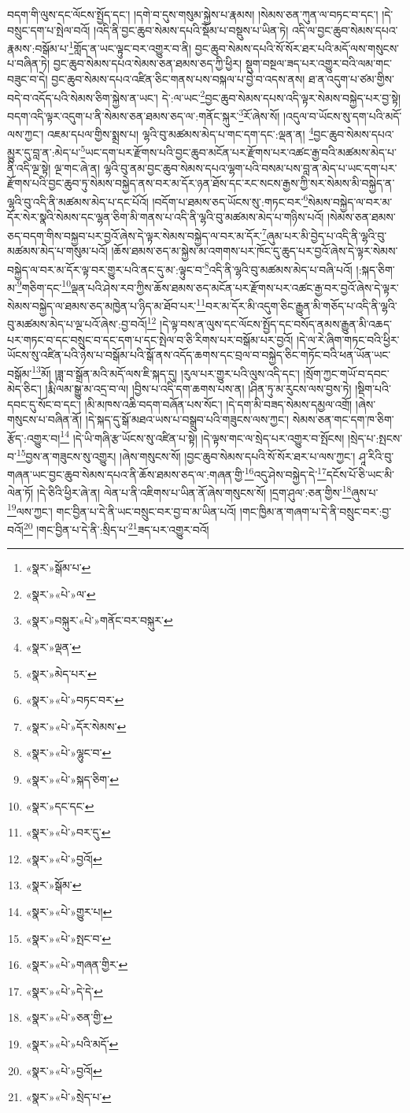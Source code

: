 བདག་གི་ལུས་དང་ལོངས་སྤྱོད་དང་། །དགེ་བ་དུས་གསུམ་སྐྱེས་པ་རྣམས། །སེམས་ཅན་ཀུན་ལ་བཏང་བ་དང་། །དེ་བསྲུང་དག་པ་སྤེལ་བའོ། །འདི་ནི་བྱང་ཆུབ་སེམས་དཔའི་སྡོམ་པ་བསྡུས་པ་ཡིན་ཏེ། འདི་ལ་བྱང་ཆུབ་སེམས་དཔའ་རྣམས་:བསྒོམ་པ་\footnote{«སྣར་»སྒོམ་པ་}གློད་ན་ཡང་ལྟུང་བར་འགྱུར་བ་ནི། བྱང་ཆུབ་སེམས་དཔའི་སོ་སོར་ཐར་པའི་མདོ་ལས་གསུངས་པ་བཞིན་ཏེ། བྱང་ཆུབ་སེམས་དཔའ་སེམས་ཅན་ཐམས་ཅད་ཀྱི་ཕྱིར། སྡུག་བསྔལ་ཟད་པར་འགྱུར་བའི་ལམ་གང་བཟུང་བ་དེ། བྱང་ཆུབ་སེམས་དཔའ་འཛིན་ཅིང་གནས་པས་བསྐལ་པ་བྱེ་བ་འདས་ནས། ཐ་ན་འདུག་པ་ཙམ་གྱིས་བདེ་བ་འདོད་པའི་སེམས་ཅིག་སྐྱེས་ན་ཡང་། དེ་:ལ་ཡང་\footnote{«སྣར་»«པེ་»ལ་}བྱང་ཆུབ་སེམས་དཔས་འདི་ལྟར་སེམས་བསྐྱེད་པར་བྱ་སྟེ། བདག་འདི་ལྟར་འདུག་པ་ནི་སེམས་ཅན་ཐམས་ཅད་ལ་:གནོང་སྐུར་\footnote{«སྣར་»བསྐུར་«པེ་»གནོང་བར་བསྐུར་}རོ་ཞེས་སོ། །འདུལ་བ་ཡོངས་སུ་དག་པའི་མདོ་ལས་ཀྱང་། འཇམ་དཔལ་གྱིས་སྨྲས་པ། ལྷའི་བུ་མཚམས་མེད་པ་གང་དག་དང་:ལྡན་ན། \footnote{«སྣར་»ལྡན་}བྱང་ཆུབ་སེམས་དཔའ་མྱུར་དུ་བླ་ན་:མེད་པ་\footnote{«སྣར་»མེད་པར་}ཡང་དག་པར་རྫོགས་པའི་བྱང་ཆུབ་མངོན་པར་རྫོགས་པར་འཚང་རྒྱ་བའི་མཚམས་མེད་པ་ནི་འདི་ལྔ་སྟེ། ལྔ་གང་ཞེ་ན། ལྷའི་བུ་ནམ་བྱང་ཆུབ་སེམས་དཔའ་ལྷག་པའི་བསམ་པས་བླ་ན་མེད་པ་ཡང་དག་པར་རྫོགས་པའི་བྱང་ཆུབ་ཏུ་སེམས་བསྐྱེད་ནས་བར་མ་དོར་ཉན་ཐོས་དང་རང་སངས་རྒྱས་ཀྱི་སར་སེམས་མི་བསྐྱེད་ན་ལྷའི་བུ་འདི་ནི་མཚམས་མེད་པ་དང་པོའོ། །བདོག་པ་ཐམས་ཅད་ཡོངས་སུ་:གཏང་བར་\footnote{«སྣར་»«པེ་»བཏང་བར་}སེམས་བསྐྱེད་ལ་བར་མ་དོར་སེར་སྣའི་སེམས་དང་ལྷན་ཅིག་མི་གནས་པ་འདི་ནི་ལྷའི་བུ་མཚམས་མེད་པ་གཉིས་པའོ། །སེམས་ཅན་ཐམས་ཅད་བདག་གིས་བསྐྱབ་པར་བྱའོ་ཞེས་དེ་ལྟར་སེམས་བསྐྱེད་ལ་བར་མ་དོར་\footnote{«སྣར་»«པེ་»དོར་སེམས་}ཞུམ་པར་མི་བྱེད་པ་འདི་ནི་ལྷའི་བུ་མཚམས་མེད་པ་གསུམ་པའོ། །ཆོས་ཐམས་ཅད་མ་སྐྱེས་མ་འགགས་པར་ཁོང་དུ་ཆུད་པར་བྱའོ་ཞེས་དེ་ལྟར་སེམས་བསྐྱེད་ལ་བར་མ་དོར་ལྟ་བར་གྱུར་པའི་ནང་དུ་མ་:ལྟུང་བ་\footnote{«སྣར་»«པེ་»ལྷུང་བ་}འདི་ནི་ལྷའི་བུ་མཚམས་མེད་པ་བཞི་པའོ། །:སྐད་ཅིག་མ་\footnote{«སྣར་»«པེ་»སྐད་ཅིག་}གཅིག་དང་\footnote{«སྣར་»དང་དང་}ལྡན་པའི་ཤེས་རབ་ཀྱིས་ཆོས་ཐམས་ཅད་མངོན་པར་རྫོགས་པར་འཚང་རྒྱ་བར་བྱའོ་ཞེས་དེ་ལྟར་སེམས་བསྐྱེད་ལ་ཐམས་ཅད་མཁྱེན་པ་ཉིད་མ་ཐོབ་པར་\footnote{«སྣར་»«པེ་»བར་དུ་}བར་མ་དོར་མི་འདུག་ཅིང་རྒྱུན་མི་གཅོད་པ་འདི་ནི་ལྷའི་བུ་མཚམས་མེད་པ་ལྔ་པའོ་ཞེས་:བྱ་བའོ།\footnote{«སྣར་»«པེ་»བྱའོ།} །དེ་ལྟ་བས་ན་ལུས་དང་ལོངས་སྤྱོད་དང་བསོད་ནམས་རྒྱུན་མི་འཆད་པར་གཏང་བ་དང་བསྲུང་བ་དང་དག་པ་དང་སྤེལ་བ་ཅི་རིགས་པར་བསྒོམ་པར་བྱའོ། །དེ་ལ་རེ་ཞིག་གཏང་བའི་ཕྱིར་ཡོངས་སུ་འཛིན་པའི་ཉེས་པ་བསྒོམ་པའི་སྒོ་ནས་འདོད་ཆགས་དང་བྲལ་བ་བསྐྱེད་ཅིང་གཏོང་བའི་ཕན་ཡོན་ཡང་བསྒོམ་\footnote{«སྣར་»སྒོམ་}མོ། །ཟླ་བ་སྒྲོན་མའི་མདོ་ལས་ཇི་སྐད་དུ། །རུལ་པར་གྱུར་པའི་ལུས་འདི་དང་། །སྲོག་ཀྱང་གཡོ་བ་དབང་མེད་ཅིང་། །རྨི་ལམ་སྒྱུ་མ་འདྲ་བ་ལ། །བྱིས་པ་འདི་དག་ཆགས་པས་ན། །ཤིན་ཏུ་མ་རུངས་ལས་བྱས་ཏེ། །སྡིག་པའི་དབང་དུ་སོང་བ་དང་། །མི་མཁས་འཆི་བདག་བཞོན་པས་སོང་། །དེ་དག་མི་བཟད་སེམས་དམྱལ་འགྲོ། །ཞེས་གསུངས་པ་བཞིན་ནོ། །དེ་སྐད་དུ་སྒོ་མཐའ་ཡས་པ་བསྒྲུབ་པའི་གཟུངས་ལས་ཀྱང་། སེམས་ཅན་གང་དག་ཁ་ཅིག་རྩོད་:འགྱུར་བ།\footnote{«སྣར་»«པེ་»གྱུར་པ།} །དེ་ཡི་གཞི་རྩ་ཡོངས་སུ་འཛིན་པ་སྟེ། །དེ་ལྟས་གང་ལ་སྲེད་པར་འགྱུར་བ་སྤོངས། །སྲེད་པ་:སྤངས་བ་\footnote{«སྣར་»«པེ་»སྤང་བ་}བྱས་ན་གཟུངས་སུ་འགྱུར། །ཞེས་གསུངས་སོ། །བྱང་ཆུབ་སེམས་དཔའི་སོ་སོར་ཐར་པ་ལས་ཀྱང་། ཤཱ་རིའི་བུ་གཞན་ཡང་བྱང་ཆུབ་སེམས་དཔའ་ནི་ཆོས་ཐམས་ཅད་ལ་:གཞན་གྱི་\footnote{«སྣར་»«པེ་»གཞན་གྱིར་}འདུ་ཤེས་བསྐྱེད་དེ་\footnote{«སྣར་»«པེ་»དེ་དེ་}དངོས་པོ་ཅི་ཡང་མི་ལེན་ཏོ། །དེ་ཅིའི་ཕྱིར་ཞེ་ན། ལེན་པ་ནི་འཇིགས་པ་ཡིན་ནོ་ཞེས་གསུངས་སོ། །དྲག་ཤུལ་:ཅན་གྱིས་\footnote{«སྣར་»«པེ་»ཅན་གྱི་}ཞུས་པ་\footnote{«སྣར་»«པེ་»པའི་མདོ་}ལས་ཀྱང་། གང་བྱིན་པ་དེ་ནི་ཡང་བསྲུང་བར་བྱ་བ་མ་ཡིན་པའོ། །གང་ཁྱིམ་ན་གཞག་པ་དེ་ནི་བསྲུང་བར་:བྱ་བའོ།\footnote{«སྣར་»«པེ་»བྱའོ།} །གང་བྱིན་པ་དེ་ནི་:སྲིད་པ་\footnote{«སྣར་»«པེ་»སྲེད་པ་}ཟད་པར་འགྱུར་བའོ། 